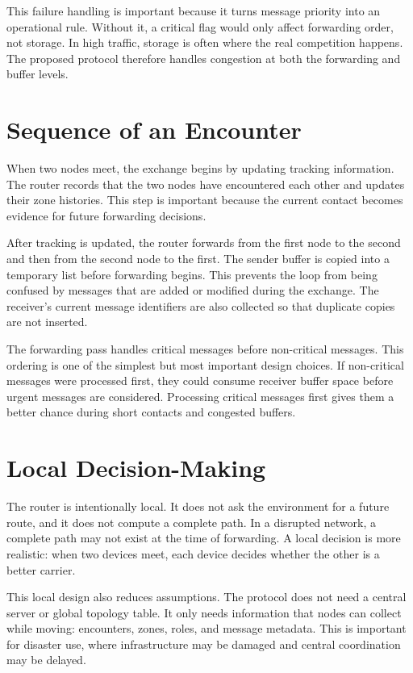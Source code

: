 This failure handling is important because it turns message priority into an operational rule. Without it, a critical flag would only affect forwarding order, not storage. In high traffic, storage is often where the real competition happens. The proposed protocol therefore handles congestion at both the forwarding and buffer levels.

\section{Sequence of an Encounter}
When two nodes meet, the exchange begins by updating tracking information. The router records that the two nodes have encountered each other and updates their zone histories. This step is important because the current contact becomes evidence for future forwarding decisions.

After tracking is updated, the router forwards from the first node to the second and then from the second node to the first. The sender buffer is copied into a temporary list before forwarding begins. This prevents the loop from being confused by messages that are added or modified during the exchange. The receiver's current message identifiers are also collected so that duplicate copies are not inserted.

The forwarding pass handles critical messages before non-critical messages. This ordering is one of the simplest but most important design choices. If non-critical messages were processed first, they could consume receiver buffer space before urgent messages are considered. Processing critical messages first gives them a better chance during short contacts and congested buffers.

\section{Local Decision-Making}
The router is intentionally local. It does not ask the environment for a future route, and it does not compute a complete path. In a disrupted network, a complete path may not exist at the time of forwarding. A local decision is more realistic: when two devices meet, each device decides whether the other is a better carrier.

This local design also reduces assumptions. The protocol does not need a central server or global topology table. It only needs information that nodes can collect while moving: encounters, zones, roles, and message metadata. This is important for disaster use, where infrastructure may be damaged and central coordination may be delayed.

